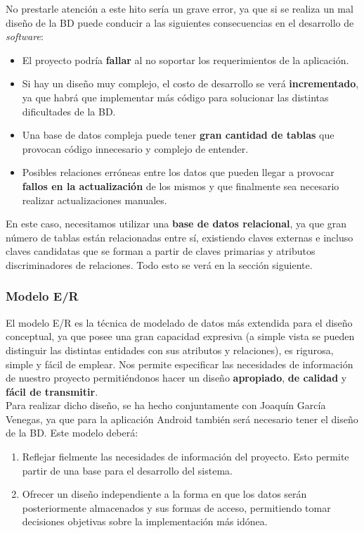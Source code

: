 No prestarle atención a este hito sería un grave error, ya que si se realiza un mal diseño
de la BD puede conducir a las siguientes consecuencias en el desarrollo de \textit{software}:

    \begin{itemize}
        \item El proyecto podría \textbf{fallar} al no soportar los requerimientos de la
        aplicación.
        \item Si hay un diseño muy complejo, el costo de desarrollo se verá
        \textbf{incrementado}, ya que habrá que implementar más código para solucionar las
        distintas dificultades de la BD.
        \item Una base de datos compleja puede tener \textbf{gran cantidad de tablas} que 
        provocan código innecesario y complejo de entender.
        \item Posibles relaciones erróneas entre los datos que pueden llegar a provocar
        \textbf{fallos en la actualización} de los mismos y que finalmente sea necesario realizar
        actualizaciones manuales.
    \end{itemize}

En este caso, necesitamos utilizar una \textbf{base de datos relacional}, ya que gran número
de tablas están relacionadas entre sí, existiendo claves externas e incluso claves
candidatas que se forman a partir de claves primarias y atributos discriminadores de
relaciones. Todo esto se verá en la sección siguiente.

    \subsubsection{Modelo E/R}
    El modelo E/R es la técnica de modelado de datos más extendida para el diseño
    conceptual, ya que posee una gran capacidad expresiva (a simple vista se pueden
    distinguir las distintas entidades con sus atributos y relaciones), es rigurosa, simple
    y fácil de emplear. Nos permite especificar las necesidades de información de nuestro
    proyecto permitiéndonos hacer un diseño \textbf{apropiado},
    \textbf{de calidad} y \textbf{fácil de transmitir}.\\

    Para realizar dicho diseño, se ha hecho conjuntamente con Joaquín García Venegas,
    ya que para la aplicación Android también será necesario tener el diseño de la BD.
    Este modelo deberá:

        \begin{enumerate}
            \item Reflejar fielmente las necesidades de información del proyecto. Esto
            permite partir de una base para el desarrollo del sistema.
            \item Ofrecer un diseño independiente a la forma en que los datos serán
            posteriormente almacenados y sus formas de acceso, permitiendo tomar decisiones
            objetivas sobre la implementación más idónea.
        \end{enumerate}


